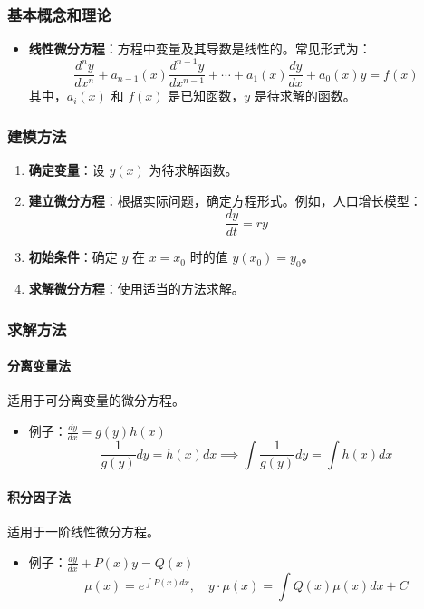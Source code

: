 \documentclass[UTF8]{ctexart}
\begin{document}
\subsubsection {基本概念和理论}
\begin{itemize}
    \item \textbf{线性微分方程}：方程中变量及其导数是线性的。常见形式为：
    \[
    \frac{d^n y}{dx^n} + a_{n-1}(x) \frac{d^{n-1} y}{dx^{n-1}} + \cdots + a_1(x) \frac{dy}{dx} + a_0(x) y = f(x)
    \]
    其中，\( a_i(x) \) 和 \( f(x) \) 是已知函数，\( y \) 是待求解的函数。
\end{itemize}

\subsubsection {建模方法}
\begin{enumerate}
    \item \textbf{确定变量}：设 \( y(x) \) 为待求解函数。
    \item \textbf{建立微分方程}：根据实际问题，确定方程形式。例如，人口增长模型：
    \[
    \frac{dy}{dt} = ry
    \]
    \item \textbf{初始条件}：确定 \( y \) 在 \( x = x_0 \) 时的值 \( y(x_0) = y_0 \)。
    \item \textbf{求解微分方程}：使用适当的方法求解。
\end{enumerate}

\subsubsection {求解方法}
\paragraph{分离变量法}
适用于可分离变量的微分方程。
\begin{itemize}
    \item 例子：\(\frac{dy}{dx} = g(y)h(x)\)
    \[
    \frac{1}{g(y)}dy = h(x)dx \implies \int \frac{1}{g(y)}dy = \int h(x)dx
    \]
\end{itemize}

\paragraph{积分因子法}
适用于一阶线性微分方程。
\begin{itemize}
    \item 例子：\( \frac{dy}{dx} + P(x)y = Q(x) \)
    \[
    \mu(x) = e^{\int P(x)dx}, \quad y \cdot \mu(x) = \int Q(x) \mu(x) dx + C
    \]
\end{itemize}
\end{document}
